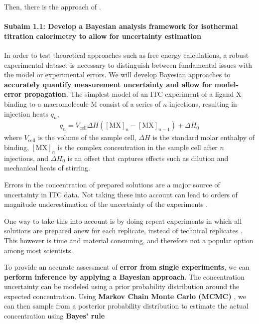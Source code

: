 \documentclass[10pt,final]{article}
\newcommand{\subsubsubsection}[1]{\paragraph*{#1}}
\begin{document}
Then, there is the approach of \cite{Lin2014a}. 


\subsubsubsection{Subaim 1.1: Develop a Bayesian analysis framework for isothermal titration calorimetry to allow for uncertainty estimation}
In order to test theoretical approaches such as free energy calculations, a robust experimental dataset is necessary to distinguish between fundamental issues with the model or experimental errors. 
We will develop Bayesian approaches to \textbf{accurately quantify measurement uncertainty and allow for model-error propagation}. 
The simplest model of an ITC experiment of a ligand $\mathrm{X}$ binding to a macromolecule $\mathrm{M}$ consist of a series of $n$ injections, resulting in injection heats $q_n$,
\begin{align}
	q_n = V_\mathrm{cell} \Delta H \left( [\mathrm{MX}]_n - [\mathrm{MX}]_{n-1} \right) + \Delta H_0 \label{equation:liberated-heat}
\end{align}
where $V_\mathrm{cell}$ is the volume of the sample cell, $\Delta H$ is the standard molar enthalpy of binding, $[\mathrm{MX}]_n$ is the complex concentration in the sample cell after $n$ injections, and $\Delta H_0$ is an offset that captures effects such as dilution and mechanical heats of stirring.


Errors in the concentration of prepared solutions are a major source of uncertainty in ITC data. Not taking these into account can lead to orders of magnitude underestimation of the uncertainty of the experiments \cite{Myszka2003a,Tellinghuisen2011a}.

One way to take this into account is by doing repeat experiments in which all solutions are prepared anew for each replicate, instead of technical replicates \cite{Vaux2012a}. This however is time and material consuming, and therefore not a popular option among most scientists. 

To provide an accurate assessment of \textbf{error from single experiments}, we can \textbf{perform inference by applying a Bayesian approach}. The concentration uncertainty can be modeled using a prior probability distribution around the expected concentration. Using \textbf{Markov Chain Monte Carlo (MCMC)} \cite{Metropolis1953a,Hastings1970a}, we can then sample from a posterior probability distribution to estimate the actual concentration using\textbf{ Bayes' rule}
\end{document}
